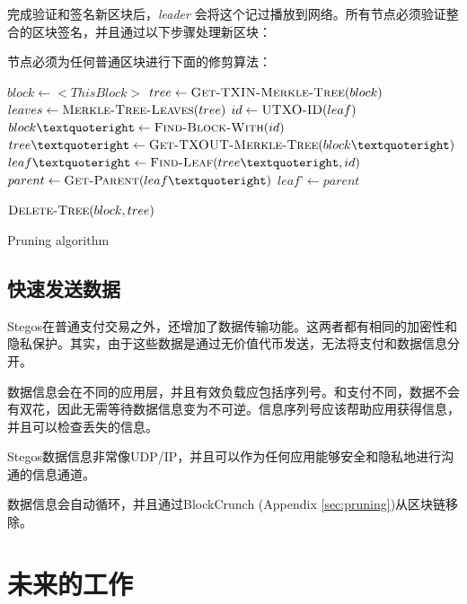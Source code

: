 \documentclass[8pt,fleqn,openany]{book}
\begin{document}
\begin{CJK*}{UTF8}{gbsn}
完成验证和签名新区块后，\textit{leader} 会将这个记过播放到网络。所有节点必须验证整合的区块签名，并且通过以下步骤处理新区块：

节点必须为任何普通区块进行下面的修剪算法：

\begin{algorithm}
\begin{algorithmic}
	\State $block \gets <This Block>$
	\State $tree \gets \Call{Get-TXIN-Merkle-Tree}{block}$
	\State $leaves \gets \Call{Merkle-Tree-Leaves}{tree}$
	\State $id \gets \Call{UTXO-ID}{leaf}$
	\State $block’ \gets \Call{Find-Block-With}{id}$
	\State $tree’ \gets \Call{Get-TXOUT-Merkle-Tree}{block’}$
	\State $leaf’ \gets \Call{Find-Leaf}{tree’, id}$
	\State {} 
		\State $parent \gets \Call{Get-Parent}{leaf’}$
		\State {}
		\State {} 
		\State {}
		\State $leaf’ \gets parent$
	\EndFor
\EndFor
	
	\State $\Call{Delete-Tree}{block, tree}$ 
\EndIf
		
\end{algorithmic}
\caption{Pruning algorithm}
\label{code:pruning}
\end{algorithm}

\section{快速发送数据}\label{sec:fastdata}
Stegos在普通支付交易之外，还增加了数据传输功能。这两者都有相同的加密性和隐私保护。其实，由于这些数据是通过无价值代币发送，无法将支付和数据信息分开。

数据信息会在不同的应用层，并且有效负载应包括序列号。和支付不同，数据不会有双花，因此无需等待数据信息变为不可逆。信息序列号应该帮助应用获得信息，并且可以检查丢失的信息。

Stegos数据信息非常像UDP/IP，并且可以作为任何应用能够安全和隐私地进行沟通的信息通道。

数据信息会自动循环，并且通过BlockCrunch (Appendix \ref{sec:pruning})从区块链移除。

\chapter{未来的工作}\label{chap:future-work}


\end{CJK*}
\end{document}
